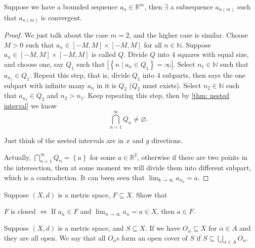 \begin{theorem}\label{thm: bolzano-weierstrass}
    Suppose we have a bounded sequence \(a_n \in \mathbb{R} ^m\), then \(\exists \) a subsequence \(a_{n(m)}\) such that \(a_{n(m)}\) is convergent.   
\end{theorem}
\begin{proof}
    We just talk about the case \(m=2\), and the higher case is similar. Choose \(M>0\) such that \(a_n \in [-M,M] \times [-M,M]\) for all \(n \in \mathbb{N} \). Suppose \(a_n \in [-M,M] \times [-M,M]\) is called \(Q\). Divide \(Q\) into \(4\) squares with equal size, and choose one, say \(Q_1\) such that \(\left\vert \left\{ n \mid a_n \in Q_1 \right\} = \infty   \right\vert \). Select \(n_1 \in \mathbb{N} \) such that \(a_{n_1} \in Q_1\). Repeat this step, that is, divide \(Q_1\) into \(4\) subparts, then says the one subpart with infinite many \(a_n\) in it is \(Q_2\) (\(Q_2\) must exists). Select \(n_2 \in \mathbb{N} \) such that \(a_{n_2} \in Q_2\) and \(n_2 > n_1\). Keep repeating this step, then by \autoref{thm: nested interval} we know
    \[
        \bigcap_{n=1}^{\infty} Q_n \neq \varnothing.
    \] 
    \begin{note}
        Just think of the nested intervals are in \(x\) and \(y\) directions.  
    \end{note}
    Actually, \(\bigcap_{n=1}^{\infty} Q_n = \left\{ a \right\} \) for some \(a \in \mathbb{R} ^2\), otherwise if there are two points in the intersection, then at some moment we will divide them into different subpart, which is a contradiction. It can been seen that \(\lim_{k \to \infty} a_{n_k} = a\).   
\end{proof}

\begin{exercise}
    Suppose \((X,d)\) is a metric space, \(F \subseteq X\). Show that 
    \begin{center}
        \(F\) is closed  \(\iff \) If \(a_n \in F\) and \(\lim_{n \to \infty} a_n = a \in X \), then \(a \in F\).    
    \end{center}
\end{exercise}

\begin{definition}
    Suppose \((X,d)\) is a metric space, and \(S \subseteq X\). If we have \(O_\alpha \subseteq X\) for \(\alpha \in A\) and they are all open. We say that all \(O_\alpha \)s form an open cover of \(S\) if \(S \subseteq \bigcup_{\alpha \in A} O_\alpha\).       
\end{definition}

